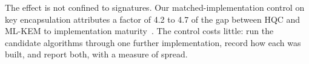 The effect is not confined to signatures. Our matched-implementation control
on key encapsulation attributes a factor of 4.2 to 4.7 of the gap between HQC
and ML-KEM to implementation maturity~\cite{alfarajat2026hqc}. The control
costs little: run the candidate algorithms through one further
implementation, record how each was built, and report both, with a measure
of spread.
